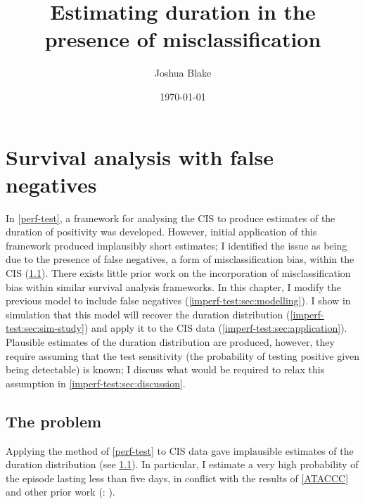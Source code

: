 \documentclass[thesis.tex]{subfiles}
\title{Estimating duration in the presence of misclassification}
\author{Joshua Blake}
\date{\today}
\begin{document}
\chapter{Survival analysis with false negatives} \label{imperf-test}

In \cref{perf-test}, a framework for analysing the CIS to produce estimates of the duration of positivity was developed.
However, initial application of this framework produced implausibly short estimates; I identified the issue as being due to the presence of false negatives, a form of misclassification bias, within the CIS (\cref{imperf-test:sec:problem}).
There exists little prior work on the incorporation of misclassification bias within similar survival analysis frameworks.
In this chapter, I modify the previous model to include false negatives (\cref{imperf-test:sec:modelling}).
I show in simulation that this model will recover the duration distribution (\cref{imperf-test:sec:sim-study}) and apply it to the CIS data (\cref{imperf-test:sec:application}).
Plausible estimates of the duration distribution are produced, however, they require assuming that the test sensitivity (the probability of testing positive given being detectable) is known; I discuss what would be required to relax this assumption in \cref{imperf-test:sec:discussion}.

\section{The problem} \label{imperf-test:sec:problem}

Applying the method of \cref{perf-test} to CIS data gave implausible estimates of the duration distribution (see \cref{imperf-test:fig:problem-cis-estimates}).
In particular, I estimate a very high probability of the episode lasting less than five days, in conflict with the results of \cref{ATACCC} and other prior work (\eg: \autocite{cevikShedding}).

\begin{figure}
  \centering %
  \caption{\label{imperf-test:fig:problem-cis-estimates}}
\end{figure}
\end{document}
